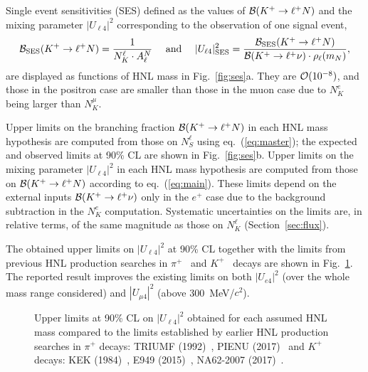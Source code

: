 \documentclass[11pt]{article}
\begin{document}
Single event sensitivities (SES) defined as the values of ${\cal B}(K^+\to\ell^+N)$ and the mixing parameter $|U_{\ell 4}|^2$ corresponding to the observation of one signal event,
\begin{displaymath}
{\cal B}_{\rm SES}(K^+\to\ell^+N) = \frac{1}{N_K^\ell \cdot A_\ell^N} ~~~~ {\rm and} ~~~~
|U_{\ell 4}|^2_{\rm SES} = \frac{{\cal B}_{\rm SES}(K^+\to\ell^+N)}{{\cal B}(K^+\to\ell^+\nu) \cdot \rho_\ell (m_N)},
\end{displaymath}
are displayed as functions of HNL mass in Fig.~\ref{fig:ses}a. They are ${\cal O}(10^{-8})$, and those in the positron case are smaller than those in the muon case due to $N_K^e$ being larger than $N_K^\mu$.

Upper limits on the branching fraction ${\cal B}(K^+\to\ell^+N)$ in each HNL mass hypothesis are computed from those on $N_S^\ell$ using eq.~(\ref{eq:master}); the expected and observed limits at 90\% CL are shown in Fig.~\ref{fig:ses}b. Upper limits on the mixing parameter $|U_{\ell 4}|^2$ in each HNL mass hypothesis are computed from those on ${\cal B}(K^+\to\ell^+N)$ according to eq.~(\ref{eq:main}). These limits depend on the external inputs ${\cal B}(K^+\to\ell^+\nu)$ only in the $e^+$ case due to the background subtraction in the $N_K^e$ computation. Systematic uncertainties on the limits are, in relative terms, of the same magnitude as those on $N_K^\ell$ (Section~\ref{sec:flux}).

The obtained upper limits on $|U_{\ell 4}|^2$ at 90\% CL together with the limits from previous HNL production searches in $\pi^+$~\cite{br92,ag17} and $K^+$~\cite{ya84,ar15,la17} decays are shown in Fig.~\ref{fig:world}. The reported result improves the existing limits on both $|U_{e4}|^2$ (over the whole mass range considered) and $|U_{\mu 4}|^2$ (above 300~MeV/$c^2$).

\begin{figure}[t]
\begin{center}
\end{center}
\vspace{-14mm}
\caption{Upper limits at 90\% CL on $|U_{\ell 4}|^2$ obtained for each assumed HNL mass compared to the limits established by earlier HNL production searches in $\pi^+$ decays:
TRIUMF (1992)~\cite{br92}, PIENU (2017)~\cite{ag17} and $K^+$ decays: KEK (1984)~\cite{ya84}, E949 (2015)~\cite{ar15}, NA62-2007 (2017)~\cite{la17}.}
\label{fig:world}
\end{figure}
\end{document}
